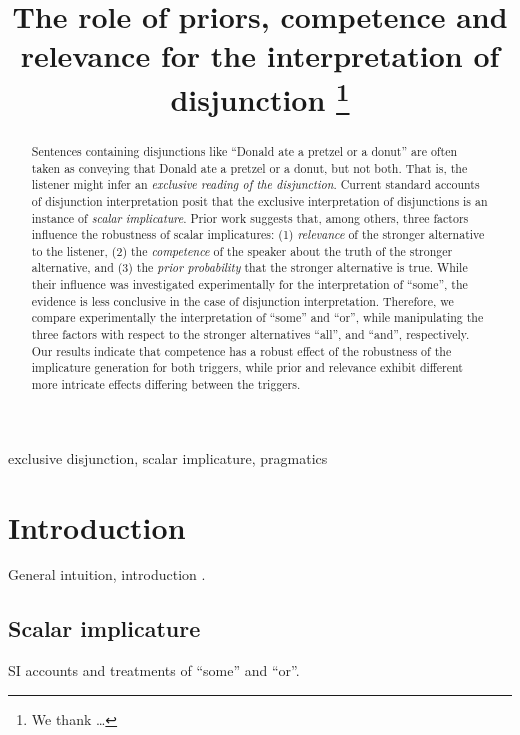 \documentclass{sp}
\title[Exclusive disjunction]{The role of priors, competence and relevance for the interpretation of disjunction%
  \thanks{We thank \ldots}}
\author[]{%
  \spauthor{Michael Franke \\ \institute{Institute1}} \AND
  \spauthor{Bob van Tiel \\ \institute{Institute2}} \AND
  \spauthor{Polina Tsvilodub \\ \institute{Institute3}}}
\begin{document}
\maketitle

\begin{abstract}
  
  Sentences containing disjunctions like ``Donald ate a pretzel or a donut'' are often taken as conveying that Donald ate a pretzel or a donut, but not both. That is, the listener might infer an \textit{exclusive reading of the disjunction}. Current standard accounts of disjunction interpretation posit that the exclusive interpretation of disjunctions is an instance of \textit{scalar implicature}. Prior work suggests that, among others, three factors influence the robustness of scalar implicatures: (1) \textit{relevance} of the stronger alternative to the listener, (2) the \textit{competence} of the speaker about the truth of the stronger alternative, and (3) the \textit{prior probability} that the stronger alternative is true. While their influence was investigated experimentally for the interpretation of ``some'', the evidence is less conclusive in the case of disjunction interpretation. Therefore, we compare experimentally the interpretation of ``some'' and ``or'', while manipulating the three factors with respect to the stronger alternatives “all”, and “and”, respectively. Our results indicate that competence has a robust effect of the robustness of the implicature generation for both triggers, while prior and relevance exhibit different more intricate effects differing between the triggers.
  
\end{abstract}

\begin{keywords}
  exclusive disjunction, scalar implicature, pragmatics
\end{keywords}

\section{Introduction}

General intuition, introduction \citep[e.g.,][]{horn1972semantic}.

\subsection{Scalar implicature}

SI accounts and treatments of ``some'' and ``or''.
\end{document}
